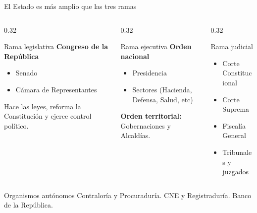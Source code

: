 \begin{frame}{El Estado es m\'as amplio que las tres ramas}
\scriptsize
\begin{columns}[T,onlytextwidth]
  \begin{column}{0.32\textwidth}
    \begin{block}{Rama legislativa}
      \textbf{Congreso de la Rep\'ublica}
      \begin{itemize}
        \item Senado
        \item C\'amara de Representantes
      \end{itemize}
      Hace las leyes, reforma la Constituci\'on y ejerce control pol\'itico.
    \end{block}
  \end{column}
  \begin{column}{0.32\textwidth}
    \begin{block}{Rama ejecutiva}
      \textbf{Orden nacional}
      \begin{itemize}
        \item Presidencia
        \item Sectores (Hacienda, Defensa, Salud, etc)
      \end{itemize}
      \textbf{Orden territorial:} Gobernaciones y Alcald\'ias.
    \end{block}
  \end{column}
  \begin{column}{0.32\textwidth}
    \begin{block}{Rama judicial}
      \begin{itemize}
        \item Corte Constitucional
        \item Corte Suprema 
        \item Fiscal\'ia General
        \item Tribunales y juzgados
      \end{itemize}
    \end{block}
  \end{column}
\end{columns}
\vspace{0.15cm}
\begin{alertblock}{Organismos autónomos}
 Contralor\'ia y Procuraduría.
\quad  CNE y Registradur\'ia.
\quad Banco de la Rep\'ublica.
\end{alertblock}
\end{frame}


